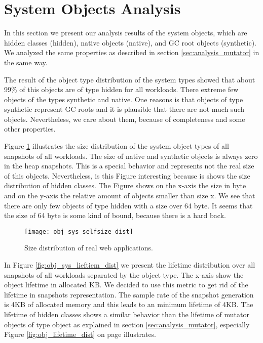 
\section{System Objects Analysis}  \label{sec:analysis_system}

In this section we present our analysis results of the system objects, which are hidden classes (hidden), native objects (native), and GC root objects (synthetic). We analyzed the same properties as described in section \ref{sec:analysis_mutator} in the same way.

The result of the object type distribution of the system types showed that about 99\% of this objects are of type hidden for all workloads. There extreme few objects of the types synthetic and native. One reasons is that objects of type synthetic represent GC roots and it is plausible that there are not much such objects. Nevertheless, we care about them, because of completeness and some other properties. 

Figure \ref{fig:obj_sys_selfsize_dist} illustrates the size distribution of the system object types of all snapshots of all workloads. The size of native and synthetic objects is always zero in the heap snapshots. This is a special behavior and represents not the real size of this objects. Nevertheless, is this Figure interesting because is shows the size distribution of hidden classes. The Figure shows on the x-axis the size in byte and on the y-axis the relative amount of objects smaller than size x. We see that there are only few objects of type hidden with a size over 64 byte. It seems that the size of 64 byte is some kind of bound, because there is a hard back. 

\begin{figure}
	\centering
	\texttt{[image: obj\_sys\_selfsize\_dist]}
	\caption{Size distribution of real web applications.}
	\label{fig:obj_sys_selfsize_dist}
\end{figure}

In Figure \ref{fig:obj_sys_lieftiem_dist} we present the lifetime distribution over all snapshots of all workloads separated by the object type. The x-axis show the object lifetime in allocated KB. We decided to use this metric to get rid of the lifetime in snapshots representation. The sample rate of the snapshot generation is 4KB of allocated memory and this leads to an minimum lifetime of 4KB. The lifetime of hidden classes shows a similar behavior than the lifetime of mutator objects of type object as explained in section \ref{sec:analysis_mutator}, especially Figure \ref{fig:obj_lifetime_dist} on page \pageref{fig:obj_lifetime_dist} illustrates. 

